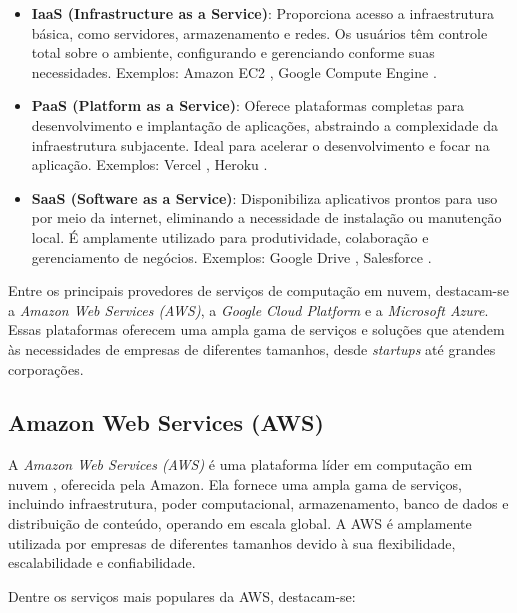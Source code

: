 \begin{itemize}
    \item \textbf{IaaS (Infrastructure as a Service)}: Proporciona acesso a infraestrutura básica, como servidores, armazenamento e redes. Os usuários têm controle total sobre o ambiente, configurando e gerenciando conforme suas necessidades. Exemplos: Amazon EC2 \cite{aws-ec2}, Google Compute Engine \cite{gcp-compute}.
    \item \textbf{PaaS (Platform as a Service)}: Oferece plataformas completas para desenvolvimento e implantação de aplicações, abstraindo a complexidade da infraestrutura subjacente. Ideal para acelerar o desenvolvimento e focar na aplicação. Exemplos: Vercel \cite{vercel}, Heroku \cite{heroku}.
    \item \textbf{SaaS (Software as a Service)}: Disponibiliza aplicativos prontos para uso por meio da internet, eliminando a necessidade de instalação ou manutenção local. É amplamente utilizado para produtividade, colaboração e gerenciamento de negócios. Exemplos: Google Drive \cite{google-drive}, Salesforce \cite{salesforce}.
\end{itemize}

Entre os principais provedores de serviços de computação em nuvem, destacam-se a \emph{Amazon Web Services (AWS)}, a \emph{Google Cloud Platform} e a \emph{Microsoft Azure}. Essas plataformas oferecem uma ampla gama de serviços e soluções que atendem às necessidades de empresas de diferentes tamanhos, desde \emph{startups} até grandes corporações.


\subsection{Amazon Web Services (AWS)}


A \emph{Amazon Web Services (AWS)} é uma plataforma líder em computação em nuvem \cite{cloud-ranking}, oferecida pela Amazon. Ela fornece uma ampla gama de serviços, incluindo infraestrutura, poder computacional, armazenamento, banco de dados e distribuição de conteúdo, operando em escala global. A AWS é amplamente utilizada por empresas de diferentes tamanhos devido à sua flexibilidade, escalabilidade e confiabilidade.

Dentre os serviços mais populares da AWS, destacam-se:

